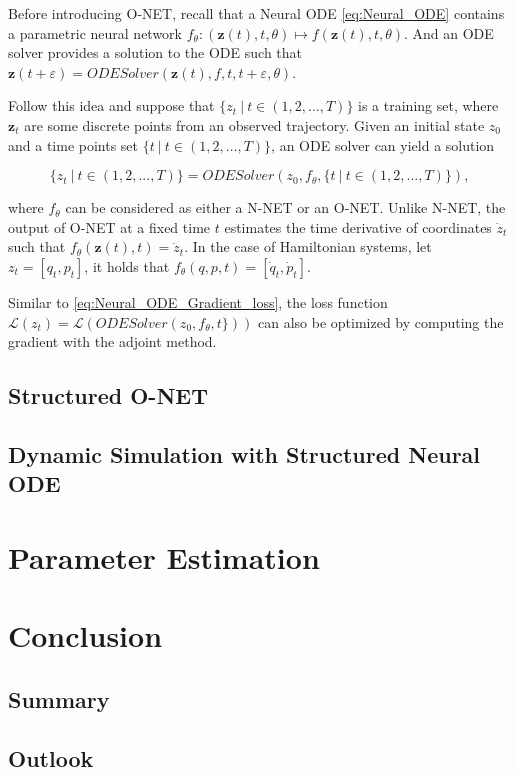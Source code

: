 \documentclass[
	parskip, 			   %
	twoside, 			   %
	DIV=14, 			   %
	BCOR=15.0mm, 		   %
	headsepline, 		   %
	open=right, 		   %
	captions=tableheading, %
	bibliography=totoc,    %
	numbers=noenddot       %
]{scrreprt}
\begin{document}
Before introducing O-NET, recall that a Neural ODE \ref{eq:Neural_ODE} contains a parametric neural network $f_{\theta}: (\mathbf{z}(t), t, \theta) \mapsto f(\mathbf{z}(t), t, \theta)$. And an ODE solver provides a solution to the ODE such that $\mathbf{z}(t+\varepsilon) = ODESolver(\mathbf{z}(t), f, t, t+\varepsilon , \theta)$.

Follow this idea and suppose that $\{ z_{t}  \: \vert \:  t \in (1, 2, ..., T)  \}$ is a training set, where $\mathbf{z}_{t}$ are some discrete points from an observed trajectory. Given an initial state $z_{0}$ and a time points set $\{ t  \: \vert \:  t \in (1, 2, ..., T)  \}$, an ODE solver can yield a solution

\begin{equation}
    \label{eq:discrete_neural_ODE}
    \{ z_{t}  \: \vert \:  t \in (1, 2, ..., T)  \} = ODESolver(z_{0}, f_{\theta}, \{ t  \: \vert \:  t \in (1, 2, ..., T)  \}),
\end{equation}

where $f_{\theta}$ can be considered as either a N-NET or an O-NET. Unlike N-NET, the output of O-NET at a fixed time $t$ estimates the time derivative of coordinates $\dot z_{t}$ such that $f_{\theta}(\mathbf{z}(t), t) = \dot z_{t}$. In the case of Hamiltonian systems, let $z_{t} = [q_{t}, p_{t}]$, it holds that $f_{\theta}(q, p, t) = [\dot q_{t}, \dot p_{t}]$.

Similar to \ref{eq:Neural_ODE_Gradient_loss}, the loss function $\mathcal{L}(z_{t}) = \mathcal{L}(ODESolver(z_{0}, f_{\theta}, t  \}))$ can also be optimized by computing the gradient with the adjoint method.


\section{Structured O-NET}
\section{Dynamic Simulation with Structured Neural ODE}

\clearpage
\chapter{Parameter Estimation}
\label{ch:chapter7}

\clearpage
\chapter{Conclusion}
\label{ch:chapter8}
\section{Summary}
\section{Outlook}



\renewcommand{\bibname}{References} %



\appendix
\end{document}
